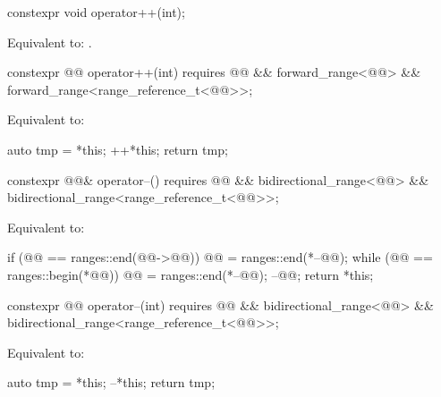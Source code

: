 %
\begin{itemdecl}
constexpr void operator++(int);
\end{itemdecl}

\begin{itemdescr}
\pnum
\effects
Equivalent to: .
\end{itemdescr}

%
\begin{itemdecl}
constexpr @@ operator++(int)
  requires @@ && forward_range<@@> &&
           forward_range<range_reference_t<@@>>;
\end{itemdecl}

\begin{itemdescr}
\pnum
\effects
Equivalent to:
\begin{codeblock}
auto tmp = *this;
++*this;
return tmp;
\end{codeblock}
\end{itemdescr}

%
\begin{itemdecl}
constexpr @@& operator--()
  requires @@ && bidirectional_range<@@> &&
           bidirectional_range<range_reference_t<@@>>;
\end{itemdecl}

\begin{itemdescr}
\pnum
\effects
Equivalent to:
\begin{codeblock}
if (@@ == ranges::end(@@->@@))
  @@ = ranges::end(*--@@);
while (@@ == ranges::begin(*@@))
  @@ = ranges::end(*--@@);
--@@;
return *this;
\end{codeblock}
\end{itemdescr}

%
\begin{itemdecl}
constexpr @@ operator--(int)
  requires @@ && bidirectional_range<@@> &&
           bidirectional_range<range_reference_t<@@>>;
\end{itemdecl}

\begin{itemdescr}
\pnum
\effects
Equivalent to:
\begin{codeblock}
auto tmp = *this;
--*this;
return tmp;
\end{codeblock}
\end{itemdescr}

